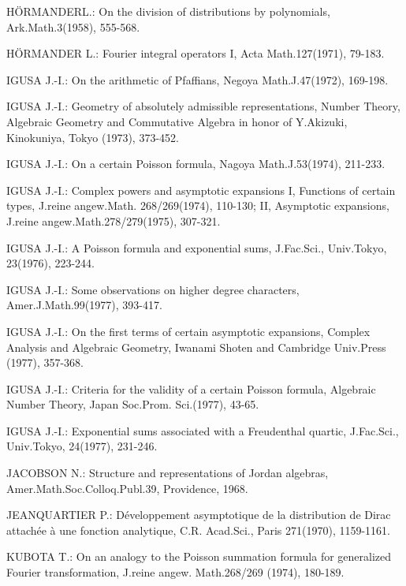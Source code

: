\begin{thebibliography}{99}
 H\"ORMANDER\pageoriginale L.: On the division of distributions by
  polynomials, Ark.\@ Math.\@ 3(1958), 555-568.

 H\"ORMANDER L.: Fourier integral operators I, Acta
  Math.\@ 127(1971), 79-183.

 IGUSA J.-I.: On the arithmetic of Pfaffians, Negoya
  Math.\@ J.\@ 47(1972), 169-198.

 IGUSA J.-I.: Geometry of absolutely admissible
  representations, Number Theory, Algebraic Geometry and Commutative
  Algebra in honor of Y.\@ Akizuki, Kinokuniya, Tokyo (1973), 373-452.

 IGUSA J.-I.: On a certain Poisson formula, Nagoya
  Math.\@ J.\@ 53(1974), 211-233.

 IGUSA J.-I.: Complex powers and asymptotic expansions
  I, Functions of certain types, J.\@ reine angew.\@ Math.\@
  268/269(1974), 110-130; II, Asymptotic expansions, J.\@ reine
  angew.\@ Math.\@ 278/279(1975), 307-321.

 IGUSA J.-I.: A Poisson formula and exponential sums,
  J.\@ Fac.\@ Sci., Univ.\@ Tokyo, 23(1976), 223-244.

 IGUSA J.-I.: Some observations on higher degree
  characters, Amer.\@ J.\@ Math.\@ 99(1977), 393-417.

 IGUSA J.-I.: On the first terms of certain asymptotic
  expansions, Complex Analysis and Algebraic Geometry, Iwanami Shoten
  and Cambridge Univ.\@ Press (1977), 357-368.

 IGUSA J.-I.: Criteria for the validity of a certain
  Poisson formula, Algebraic Number Theory, Japan Soc.\@ Prom.\@
  Sci.\@ (1977), 43-65.

 IGUSA J.-I.: Exponential sums associated with a
  Freudenthal quartic, J.\@ Fac.\@ Sci., Univ.\@ Tokyo, 24(1977),
  231-246. 

 JACOBSON N.: Structure and representations of Jordan
  algebras, Amer.\@ Math.\@ Soc.\@ Colloq.\@ Publ.\@ 39, Providence,
  1968. 

 JEANQUARTIER P.: D\'eveloppement asymptotique de la
  distribution de Dirac attach\'ee \`a une fonction analytique, C.R.\@
  Acad.\@ Sci., Paris 271(1970), 1159-1161.

 KUBOTA T.: On an analogy to the Poisson summation
  formula for generalized Fourier transformation, J.\@ reine angew.\@
  Math.\@ 268/269 (1974), 180-189. 


\end{thebibliography}
